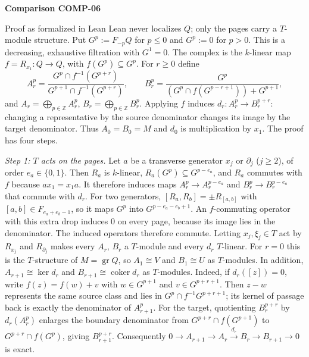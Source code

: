 \documentclass[11pt]{amsart}
\numberwithin{equation}{section}
\theoremstyle{plain}
\theoremstyle{remark}
\newcommand{\gr}{\operatorname{gr}}
\begin{document}
\par\bigskip\noindent{}\hypertarget{comparison-COMP-06}{\textbf{Comparison COMP-06}}\label{comparison-COMP-06}\par\smallskip
\begin{AIaddition}{Proof as formalized in Lean}
Lean never localizes $Q$; only the pages carry a $T$-module structure. Put
$G^p:=F_{-p}Q$ for $p\le0$ and $G^p:=0$ for $p>0$. This is a decreasing,
exhaustive filtration with $G^1=0$. The complex is the $k$-linear map
$f=R_{x_1}\colon Q\to Q$, with $f(G^p)\subseteq G^p$. For $r\ge0$ define
\[
 A_r^p=\frac{G^p\cap f^{-1}(G^{p+r})}{G^{p+1}\cap f^{-1}(G^{p+r})},
 \qquad B_r^p=\frac{G^p}{(G^p\cap f(G^{p-r+1}))+G^{p+1}},
\]
and $A_r=\bigoplus_{p\in\mathbb Z} A_r^p$, $B_r=\bigoplus_{p\in\mathbb Z} B_r^p$.
Applying $f$ induces $d_r\colon A_r^p\to B_r^{p+r}$: changing a representative
by the source denominator changes its image by the target denominator.
Thus $A_0=B_0=M$ and $d_0$ is multiplication by $x_1$. The proof has four steps.

\emph{Step 1: $T$ acts on the pages.} Let $a$ be a transverse generator
$x_j$ or $\partial_j$ ($j\ge2$), of order $e_a\in\{0,1\}$. Then $R_a$ is
$k$-linear, $R_a(G^p)\subseteq G^{p-e_a}$, and $R_a$ commutes with $f$
because $ax_1=x_1a$. It therefore induces maps $A_r^p\to A_r^{p-e_a}$ and
$B_r^p\to B_r^{p-e_a}$ that commute with $d_r$. For two generators,
$[R_a,R_b]=\pm R_{[a,b]}$ with $[a,b]\in F_{e_a+e_b-1}$, so it maps $G^p$ into
$G^{p-e_a-e_b+1}$. An $f$-commuting operator with this extra drop induces
$0$ on every page, because its image lies in the denominator. The induced
operators therefore commute. Letting $x_j,\xi_j\in T$ act by $R_{x_j}$ and
$R_{\partial_j}$ makes every $A_r$, $B_r$ a $T$-module and every $d_r$
$T$-linear. For $r=0$ this is the $T$-structure of $M=\gr Q$, so
$A_1\cong V$ and $B_1\cong U$ as $T$-modules. In addition,
$A_{r+1}\cong\ker d_r$ and $B_{r+1}\cong\operatorname{coker}d_r$ as
$T$-modules. Indeed, if $d_r([z])=0$, write $f(z)=f(w)+v$ with
$w\in G^{p+1}$ and $v\in G^{p+r+1}$. Then $z-w$ represents the same source
class and lies in $G^p\cap f^{-1}G^{p+r+1}$; its kernel of passage back
is exactly the denominator of $A_{r+1}^p$. For the target, quotienting
$B_r^{p+r}$ by $d_r(A_r^p)$ enlarges the boundary denominator from
$G^{p+r}\cap f(G^{p+1})$ to $G^{p+r}\cap f(G^p)$, giving $B_{r+1}^{p+r}$.
Consequently $0\to A_{r+1}\to A_r\xrightarrow{d_r}B_r\to B_{r+1}\to0$
is exact.


\end{AIaddition}
\end{document}
